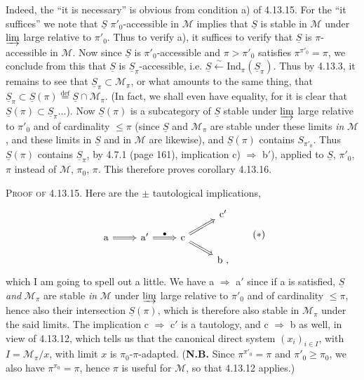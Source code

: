 \documentclass[11pt]{article}
\newcommand{\printedpage}[1]{\marginpar{\footnotesize p.~#1}}
\newcommand{\msp}[1]{\marginpar{\footnotesize [#1]}}
\newcommand{\uS}{\underline{S}}
\begin{document}
Indeed, the ``it is necessary'' is obvious from condition a) of 4.13.15. For the ``it suffices'' we note that $\uS$ $\pi'_0$-accessible in $\mathcal{M}$ implies that $\uS$ is stable in $\mathcal{M}$ under $\varinjlim$ large relative to $\pi'_0$. Thus to verify a), it suffices to verify that $\uS$ is $\pi$-accessible in $\mathcal{M}$. Now since $\uS$ is\msp{page 310} $\pi'_0$-accessible and $\pi > \pi'_0$ satisfies $\pi^{\pi'_0} = \pi$, we conclude from this that $\uS$ is $\uS_\pi$-accessible, i.e. $\uS \xleftarrow{\ \sim\ } \mathrm{Ind}_\pi(\uS_\pi)$. Thus by 4.13.3, it remains to see that $\uS_\pi \subset \mathcal{M}_\pi$, or what amounts to the same thing, that $\uS_\pi \subset \uS(\pi) \overset{\text{def}}{=} \uS \cap \mathcal{M}_\pi$. (In fact, we shall even have equality, for it is clear that $\uS(\pi) \subset \uS_\pi \ldots$). Now $\uS(\pi)$ is a subcategory of $\uS$ stable under $\varinjlim$ large relative to $\pi'_0$ and of cardinality $\leqslant \pi$ (since $\uS$ and $\mathcal{M}_\pi$ are stable under these limits \textit{in} $\mathcal{M}$, and these limits in $\uS$ and in $\mathcal{M}$ are likewise), and $\uS(\pi)$ contains $S_{\pi'_0}$. Thus $\uS(\pi)$ contains $\uS_\pi$, by 4.7.1 (page 161), implication c) $\Longrightarrow$ b$'$), applied to $\uS$, $\pi'_0$, $\pi$ instead of $\mathcal{M}$, $\pi_0$, $\pi$. This therefore proves corollary 4.13.16. %

\textsc{Proof of} 4.13.15. Here are the $\pm$ tautological implications,
\[
\begin{tikzcd}[row sep=small]
 & & & \mathrm{c}' \\
\mathrm{a} \arrow[r, Rightarrow] & \mathrm{a}' \arrow[r, Rightarrow, "\bullet"] & \mathrm{c} \arrow[ur, Rightarrow] \arrow[dr, Rightarrow] & \\
 & & & \mathrm{b}\ ,
\end{tikzcd}
\tag*{$(*)$}
\]
\msp{page 311}which I am going to spell out a little. We have a $\Longrightarrow$ a$'$ since if a is satisfied, $\uS$ \textit{and} $\mathcal{M}_\pi$ are stable \textit{in} $\mathcal{M}$ under $\varinjlim$ large relative to $\pi'_0$ and of cardinality $\leqslant \pi$, hence also their intersection $\uS(\pi)$,
\printedpage{117}
which is therefore also stable in $\mathcal{M}_\pi$ under the said limits. The implication c $\Longrightarrow$ c$'$ is a tautology, and c $\Longrightarrow$ b as well, in view of 4.13.12, which tells us that the canonical direct system $(x_i)_{i\in I}$, with $I = \mathcal{M}_\pi/x$, with limit $x$ is $\pi_0$-$\pi$-adapted. (\textbf{N.B.} Since $\pi^{\pi'_0} = \pi$ and $\pi'_0 \geqslant \pi_0$, we also have $\pi^{\pi_0} = \pi$, hence $\pi$ is useful for $\mathcal{M}$, so that 4.13.12 applies.)
\end{document}
